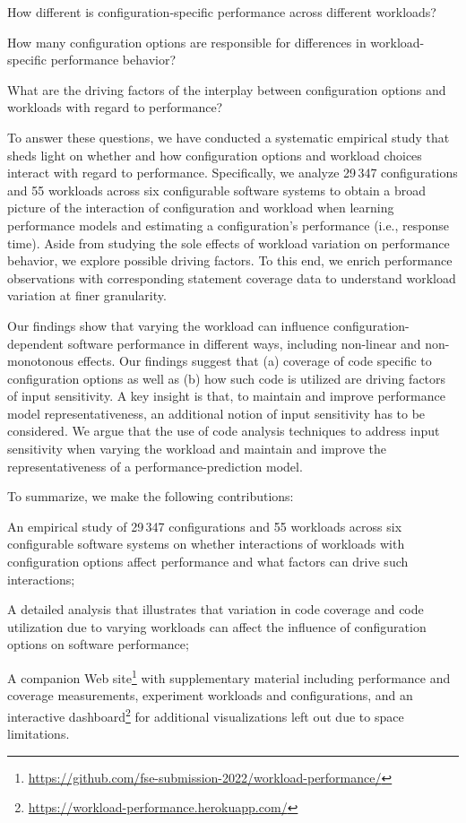 \begin{compactitem}
	\item How different is configuration-specific performance across different workloads? 
	\item How many configuration options are responsible for differences in workload-specific performance behavior?
	\item What are the driving factors of the interplay between configuration options and workloads with regard to performance? 
\end{compactitem}

To answer these questions, we have conducted a systematic empirical study that sheds light on whether and how configuration options and workload choices interact with regard to performance. 
Specifically, we analyze 29\,347 configurations and 55 workloads across six configurable software systems to obtain a broad picture of the interaction of configuration and workload when learning performance models and estimating a configuration's performance (i.e., response time). Aside from studying the sole effects of workload variation on performance behavior, we explore possible driving factors. To this end, we enrich performance observations with corresponding statement coverage data to understand workload variation at finer granularity.

Our findings show that varying the workload can influence con\-fi\-gu\-ra\-tion-de\-pen\-dent software performance in different ways, including non-linear and non-monotonous effects. Our findings suggest that (a) coverage of code  specific to configuration options as well as (b) how such code is utilized are driving factors of input sensitivity. A key insight is that, to maintain and improve performance model representativeness, an additional notion of input sensitivity has to be considered. We argue that the use of code analysis techniques to address input sensitivity when varying the workload and maintain and improve the representativeness of a performance-prediction model.

To summarize, we make the following contributions: 

\begin{compactitem}
	\item {\color{red}An empirical study of 29\,347 configurations and 55 workloads across six configurable software systems on whether interactions of workloads with configuration options affect performance and what factors can drive such interactions;}
	
	\item A detailed analysis that illustrates that variation in code coverage and code utilization due to varying workloads can affect the influence of configuration options on software performance; 
	
	\item A companion Web site\footnote{\url{https://github.com/fse-submission-2022/workload-performance/}} with supplementary material including performance and coverage measurements, experiment workloads and configurations, and an interactive dashboard\footnote{\url{https://workload-performance.herokuapp.com/}} for additional visualizations left out due to space limitations.
\end{compactitem}



